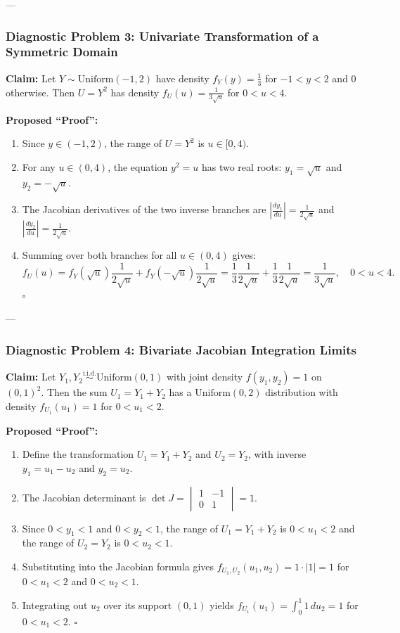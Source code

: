 \documentclass[11pt, letterpaper]{article}
\theoremstyle{definition}
\theoremstyle{remark}
\begin{document}
---

\subsubsection*{Diagnostic Problem 3: Univariate Transformation of a Symmetric Domain}
\textbf{Claim:} Let $Y \sim \text{Uniform}(-1, 2)$ have density $f_Y(y) = \frac{1}{3}$ for $-1 < y < 2$ and $0$ otherwise. Then $U = Y^2$ has density $f_U(u) = \frac{1}{3\sqrt{u}}$ for $0 < u < 4$.

\textbf{Proposed ``Proof'':}
\begin{enumerate}[label=\textbf{Line \arabic*:}]
    \item Since $y \in (-1, 2)$, the range of $U = Y^2$ is $u \in [0, 4)$.
    \item For any $u \in (0, 4)$, the equation $y^2 = u$ has two real roots: $y_1 = \sqrt{u}$ and $y_2 = -\sqrt{u}$.
    \item The Jacobian derivatives of the two inverse branches are $\left|\frac{dy_1}{du}\right| = \frac{1}{2\sqrt{u}}$ and $\left|\frac{dy_2}{du}\right| = \frac{1}{2\sqrt{u}}$.
    \item Summing over both branches for all $u \in (0, 4)$ gives:
    \[
        f_U(u) = f_Y(\sqrt{u})\frac{1}{2\sqrt{u}} + f_Y(-\sqrt{u})\frac{1}{2\sqrt{u}} = \frac{1}{3}\frac{1}{2\sqrt{u}} + \frac{1}{3}\frac{1}{2\sqrt{u}} = \frac{1}{3\sqrt{u}}, \quad 0 < u < 4.
    \]
    \hfill $\square$
\end{enumerate}

---

\subsubsection*{Diagnostic Problem 4: Bivariate Jacobian Integration Limits}
\textbf{Claim:} Let $Y_1, Y_2 \stackrel{\text{i.i.d.}}{\sim} \text{Uniform}(0, 1)$ with joint density $f(y_1, y_2) = 1$ on $(0, 1)^2$. Then the sum $U_1 = Y_1 + Y_2$ has a $\text{Uniform}(0, 2)$ distribution with density $f_{U_1}(u_1) = 1$ for $0 < u_1 < 2$.

\textbf{Proposed ``Proof'':}
\begin{enumerate}[label=\textbf{Line \arabic*:}]
    \item Define the transformation $U_1 = Y_1 + Y_2$ and $U_2 = Y_2$, with inverse $y_1 = u_1 - u_2$ and $y_2 = u_2$.
    \item The Jacobian determinant is $\det J = \begin{vmatrix} 1 & -1 \\ 0 & 1 \end{vmatrix} = 1$.
    \item Since $0 < y_1 < 1$ and $0 < y_2 < 1$, the range of $U_1 = Y_1 + Y_2$ is $0 < u_1 < 2$ and the range of $U_2 = Y_2$ is $0 < u_2 < 1$.
    \item Substituting into the Jacobian formula gives $f_{U_1, U_2}(u_1, u_2) = 1 \cdot |1| = 1$ for $0 < u_1 < 2$ and $0 < u_2 < 1$.
    \item Integrating out $u_2$ over its support $(0, 1)$ yields $f_{U_1}(u_1) = \int_{0}^{1} 1 \, du_2 = 1$ for $0 < u_1 < 2$. \hfill $\square$
\end{enumerate}
\end{document}
